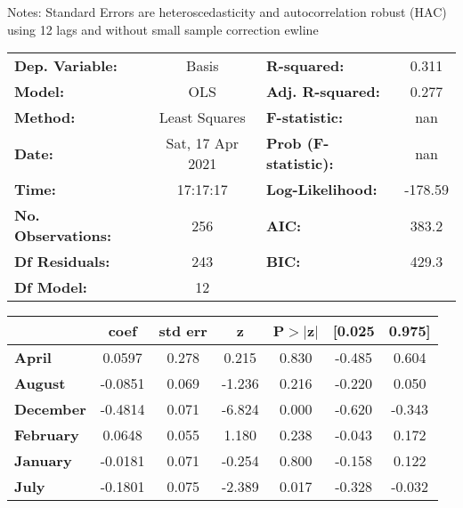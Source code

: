 Notes: \newline
 [1] Standard Errors are heteroscedasticity and autocorrelation robust (HAC) using 12 lags and without small sample correction
ewline\begin{center}
\begin{tabular}{lclc}
\toprule
\textbf{Dep. Variable:}    &      Basis       & \textbf{  R-squared:         } &     0.311   \\
\textbf{Model:}            &       OLS        & \textbf{  Adj. R-squared:    } &     0.277   \\
\textbf{Method:}           &  Least Squares   & \textbf{  F-statistic:       } &       nan   \\
\textbf{Date:}             & Sat, 17 Apr 2021 & \textbf{  Prob (F-statistic):} &      nan    \\
\textbf{Time:}             &     17:17:17     & \textbf{  Log-Likelihood:    } &   -178.59   \\
\textbf{No. Observations:} &         256      & \textbf{  AIC:               } &     383.2   \\
\textbf{Df Residuals:}     &         243      & \textbf{  BIC:               } &     429.3   \\
\textbf{Df Model:}         &          12      & \textbf{                     } &             \\
\bottomrule
\end{tabular}
\begin{tabular}{lcccccc}
                   & \textbf{coef} & \textbf{std err} & \textbf{z} & \textbf{P$> |$z$|$} & \textbf{[0.025} & \textbf{0.975]}  \\
\midrule
\textbf{April}     &       0.0597  &        0.278     &     0.215  &         0.830        &       -0.485    &        0.604     \\
\textbf{August}    &      -0.0851  &        0.069     &    -1.236  &         0.216        &       -0.220    &        0.050     \\
\textbf{December}  &      -0.4814  &        0.071     &    -6.824  &         0.000        &       -0.620    &       -0.343     \\
\textbf{February}  &       0.0648  &        0.055     &     1.180  &         0.238        &       -0.043    &        0.172     \\
\textbf{January}   &      -0.0181  &        0.071     &    -0.254  &         0.800        &       -0.158    &        0.122     \\
\textbf{July}      &      -0.1801  &        0.075     &    -2.389  &         0.017        &       -0.328    &       -0.032     \\

\end{tabular}
\end{center}
